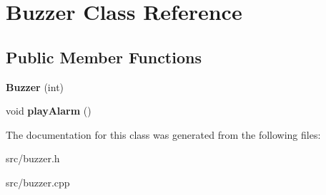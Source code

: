 \hypertarget{class_buzzer}{}\section{Buzzer Class Reference}
\label{class_buzzer}
\subsection*{Public Member Functions}
\begin{DoxyCompactItemize}
\item 
\hypertarget{class_buzzer_a38e926a694e675ae3034bf26b578b6f8}{}{\bfseries Buzzer} (int)\label{class_buzzer_a38e926a694e675ae3034bf26b578b6f8}

\item 
\hypertarget{class_buzzer_a7bada0b43035df88c745fc17f77880a0}{}void {\bfseries play\+Alarm} ()\label{class_buzzer_a7bada0b43035df88c745fc17f77880a0}

\end{DoxyCompactItemize}


The documentation for this class was generated from the following files\+:\begin{DoxyCompactItemize}
\item 
src/buzzer.\+h\item 
src/buzzer.\+cpp\end{DoxyCompactItemize}
